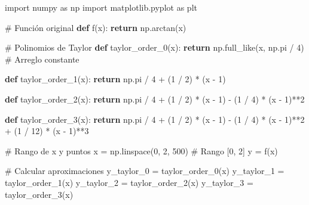 \documentclass[
  letterpaper,
  DIV=11,
  numbers=noendperiod]{scrartcl}
\newenvironment{Shaded}{\begin{snugshade}}{\end{snugshade}}
\newcommand{\CommentTok}[1]{\textcolor[rgb]{0.37,0.37,0.37}{#1}}
\newcommand{\ControlFlowTok}[1]{\textcolor[rgb]{0.00,0.23,0.31}{\textbf{#1}}}
\newcommand{\DecValTok}[1]{\textcolor[rgb]{0.68,0.00,0.00}{#1}}
\newcommand{\ImportTok}[1]{\textcolor[rgb]{0.00,0.46,0.62}{#1}}
\newcommand{\KeywordTok}[1]{\textcolor[rgb]{0.00,0.23,0.31}{\textbf{#1}}}
\newcommand{\NormalTok}[1]{\textcolor[rgb]{0.00,0.23,0.31}{#1}}
\newcommand{\OperatorTok}[1]{\textcolor[rgb]{0.37,0.37,0.37}{#1}}
\begin{document}
\begin{Shaded}
\begin{Highlighting}[]
\ImportTok{import}\NormalTok{ numpy }\ImportTok{as}\NormalTok{ np}
\ImportTok{import}\NormalTok{ matplotlib.pyplot }\ImportTok{as}\NormalTok{ plt}

\CommentTok{\# Función original}
\KeywordTok{def}\NormalTok{ f(x):}
    \ControlFlowTok{return}\NormalTok{ np.arctan(x)}

\CommentTok{\# Polinomios de Taylor}
\KeywordTok{def}\NormalTok{ taylor\_order\_0(x):}
    \ControlFlowTok{return}\NormalTok{ np.full\_like(x, np.pi }\OperatorTok{/} \DecValTok{4}\NormalTok{)  }\CommentTok{\# Arreglo constante}

\KeywordTok{def}\NormalTok{ taylor\_order\_1(x):}
    \ControlFlowTok{return}\NormalTok{ np.pi }\OperatorTok{/} \DecValTok{4} \OperatorTok{+}\NormalTok{ (}\DecValTok{1} \OperatorTok{/} \DecValTok{2}\NormalTok{) }\OperatorTok{*}\NormalTok{ (x }\OperatorTok{{-}} \DecValTok{1}\NormalTok{)}

\KeywordTok{def}\NormalTok{ taylor\_order\_2(x):}
    \ControlFlowTok{return}\NormalTok{ np.pi }\OperatorTok{/} \DecValTok{4} \OperatorTok{+}\NormalTok{ (}\DecValTok{1} \OperatorTok{/} \DecValTok{2}\NormalTok{) }\OperatorTok{*}\NormalTok{ (x }\OperatorTok{{-}} \DecValTok{1}\NormalTok{) }\OperatorTok{{-}}\NormalTok{ (}\DecValTok{1} \OperatorTok{/} \DecValTok{4}\NormalTok{) }\OperatorTok{*}\NormalTok{ (x }\OperatorTok{{-}} \DecValTok{1}\NormalTok{)}\OperatorTok{**}\DecValTok{2}

\KeywordTok{def}\NormalTok{ taylor\_order\_3(x):}
    \ControlFlowTok{return}\NormalTok{ np.pi }\OperatorTok{/} \DecValTok{4} \OperatorTok{+}\NormalTok{ (}\DecValTok{1} \OperatorTok{/} \DecValTok{2}\NormalTok{) }\OperatorTok{*}\NormalTok{ (x }\OperatorTok{{-}} \DecValTok{1}\NormalTok{) }\OperatorTok{{-}}\NormalTok{ (}\DecValTok{1} \OperatorTok{/} \DecValTok{4}\NormalTok{) }\OperatorTok{*}\NormalTok{ (x }\OperatorTok{{-}} \DecValTok{1}\NormalTok{)}\OperatorTok{**}\DecValTok{2} \OperatorTok{+}\NormalTok{ (}\DecValTok{1} \OperatorTok{/} \DecValTok{12}\NormalTok{) }\OperatorTok{*}\NormalTok{ (x }\OperatorTok{{-}} \DecValTok{1}\NormalTok{)}\OperatorTok{**}\DecValTok{3}

\CommentTok{\# Rango de x y puntos}
\NormalTok{x }\OperatorTok{=}\NormalTok{ np.linspace(}\DecValTok{0}\NormalTok{, }\DecValTok{2}\NormalTok{, }\DecValTok{500}\NormalTok{)  }\CommentTok{\# Rango [0, 2]}
\NormalTok{y }\OperatorTok{=}\NormalTok{ f(x)}

\CommentTok{\# Calcular aproximaciones}
\NormalTok{y\_taylor\_0 }\OperatorTok{=}\NormalTok{ taylor\_order\_0(x)}
\NormalTok{y\_taylor\_1 }\OperatorTok{=}\NormalTok{ taylor\_order\_1(x)}
\NormalTok{y\_taylor\_2 }\OperatorTok{=}\NormalTok{ taylor\_order\_2(x)}
\NormalTok{y\_taylor\_3 }\OperatorTok{=}\NormalTok{ taylor\_order\_3(x)}


\end{Highlighting}
\end{Shaded}
\end{document}
